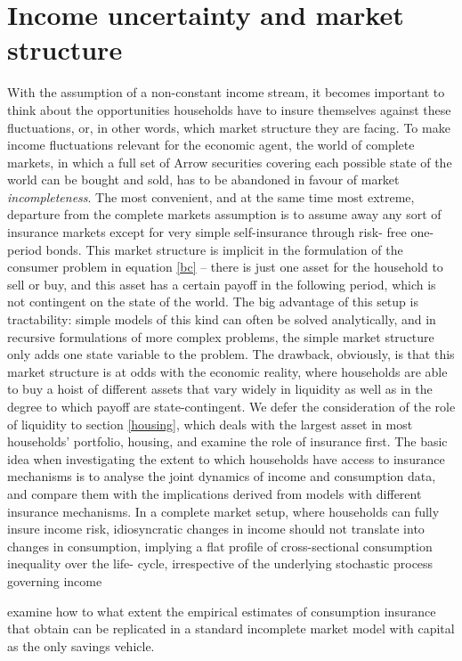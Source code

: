 \section{Income uncertainty and market structure}
With the assumption of a non-constant income stream, it becomes important to 
think about the opportunities households have to insure themselves against
these fluctuations, or, in other words, which market structure they are facing.
To make income fluctuations relevant for the economic agent, the world of 
complete markets, in which a full set of Arrow securities covering each possible
state of the world can be bought and sold, has to be abandoned in favour of 
market \textit{incompleteness}. The most convenient, and at the same time most
extreme, departure from the complete markets assumption is to assume away any
sort of insurance markets except for very simple self-insurance through risk-
free one-period bonds. This market structure is implicit in the formulation of
the consumer problem in equation \ref{bc} -- there is just one asset for the 
household to sell or buy, and this asset has a certain payoff in the following 
period, which is not contingent on the state of the world. The big advantage of 
this setup is tractability: simple models of this kind can often be solved 
analytically, and in recursive formulations of more complex problems, the simple
market structure only adds one state variable to the problem. The drawback, 
obviously, is that this market structure is at odds with the economic reality,
where households are able to buy a hoist of different assets that vary widely 
in liquidity as well as in the degree to which payoff are state-contingent.
We defer the consideration of the role of liquidity to section \ref{housing}, 
which deals with the largest asset in most households' portfolio, housing, and
examine the role of insurance first. The basic idea when investigating the 
extent to which households have access to insurance mechanisms is to analyse
the joint dynamics of income and consumption data, and compare them with the
implications derived from models with different insurance mechanisms. In a 
complete market setup, where households can fully insure income risk, 
idiosyncratic changes in income should not translate into changes in consumption,
implying a flat profile of cross-sectional consumption inequality over the life-
cycle, irrespective of the underlying stochastic process governing income


\citet{BlundellPistaferriPreston2008}

\citet{KaplanViolante2010} examine how to what extent the empirical estimates
of consumption insurance that \citet{BlundellPistaferriPreston2008} obtain can
be replicated in a standard incomplete market model with capital as the only 
savings vehicle. 

